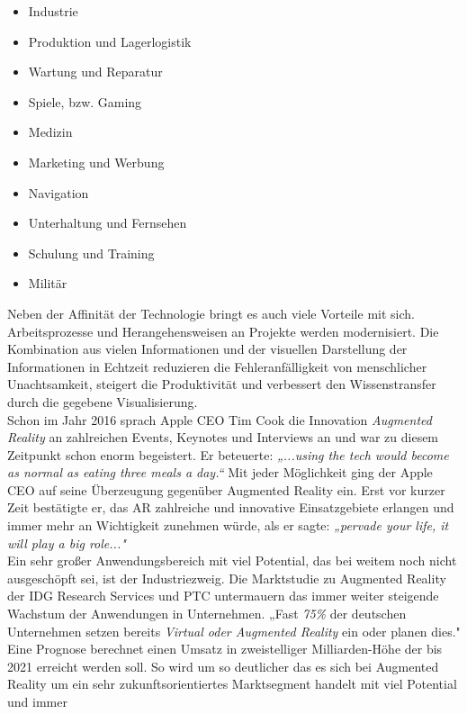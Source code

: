 \begin{itemize}
    \item Industrie 
    \item Produktion und Lagerlogistik
    \item Wartung und Reparatur
    \item Spiele, bzw. Gaming 
    \item Medizin
    \item Marketing und Werbung
    \item Navigation
    \item Unterhaltung und Fernsehen 
    \item Schulung und Training
    \item Militär
\end{itemize} 
Neben der Affinität der Technologie bringt es auch viele Vorteile mit sich. Arbeitsprozesse und Herangehensweisen an Projekte werden 
modernisiert. Die Kombination aus vielen Informationen und der visuellen Darstellung der Informationen in Echtzeit reduzieren die 
Fehleranfälligkeit von menschlicher Unachtsamkeit, steigert die Produktivität und verbessert den Wissenstransfer durch die gegebene 
Visualisierung. 
\\ 
\linebreak
Schon im Jahr 2016 sprach Apple CEO Tim Cook die Innovation \textit{Augmented Reality} an zahlreichen Events, Keynotes und Interviews 
an und war zu diesem Zeitpunkt schon enorm begeistert. Er beteuerte: \textit{„...using the tech would become as normal as eating three 
meals a day.“} \cite{timcook2016.2016o} Mit jeder Möglichkeit ging der Apple CEO auf seine Überzeugung gegenüber Augmented Reality ein. 
Erst vor kurzer Zeit bestätigte er, das AR zahlreiche und innovative Einsatzgebiete erlangen und immer mehr an Wichtigkeit zunehmen 
würde, als er sagte: \textit{„pervade your life, it will play a big role..."} \cite{timcook.2020j} 
\\ 
\linebreak
Ein sehr großer Anwendungsbereich mit viel Potential, das bei weitem noch nicht ausgeschöpft sei, ist der Industriezweig. Die 
Marktstudie zu Augmented Reality der IDG Research Services und PTC untermauern das immer weiter steigende Wachstum der Anwendungen in 
Unternehmen. „Fast \textit{75\%} der deutschen Unternehmen setzen bereits \textit{Virtual oder Augmented Reality} ein oder planen dies." 
\cite{studieptc.2020j} Eine Prognose berechnet einen Umsatz in zweistelliger Milliarden-Höhe der bis 2021 erreicht werden soll. So wird 
um so deutlicher das es sich bei Augmented Reality um ein sehr zukunftsorientiertes Marktsegment handelt mit viel Potential und immer 
